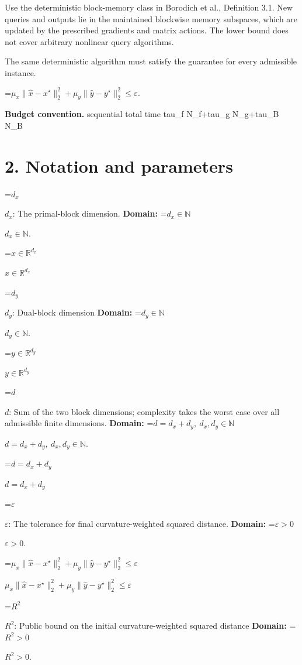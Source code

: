 \documentclass[10pt,a4paper]{article}
\newcommand{\AtlasMath}[1]{\par\begingroup\centering\setbox0=\hbox{$\displaystyle #1$}\ifdim\wd0>1.4\linewidth\typeout{ATLAS WIDE FORMULA: \the\wd0}\fi\ifdim\wd0>\linewidth\resizebox{\linewidth}{!}{\box0}\else\box0\fi\par\endgroup}
\newcommand{\AtlasInlineMath}[1]{\begingroup\setbox0=\hbox{$#1$}\ifdim\wd0>.4\linewidth\endgroup\AtlasMath{#1}\else\endgroup$#1$\fi}
\begin{document}
Use the deterministic block-memory class in Borodich et al., Definition 3.1. New queries and outputs lie in the maintained blockwise memory subspaces, which are updated by the prescribed gradients and matrix actions. The lower bound does not cover arbitrary nonlinear query algorithms.



The same deterministic algorithm must satisfy the guarantee for every admissible instance.




\AtlasMath{\mu_x\|\widehat{x}-x^\star\|_2^2+\mu_y\|\widehat{y}-y^\star\|_2^2\le\varepsilon.}




\textbf{Budget convention.} sequential total time tau\_f N\_f+tau\_g N\_g+tau\_B N\_B



\section{2. Notation and parameters}


\AtlasInlineMath{d_x}: The primal-block dimension. \textbf{Domain:} \AtlasInlineMath{d_x\in\mathbb N}.



\AtlasInlineMath{x\in\mathbb R^{d_x}}



\AtlasInlineMath{d_y}: Dual-block dimension \textbf{Domain:} \AtlasInlineMath{d_y\in\mathbb N}.



\AtlasInlineMath{y\in\mathbb R^{d_y}}



\AtlasInlineMath{d}: Sum of the two block dimensions; complexity takes the worst case over all admissible finite dimensions. \textbf{Domain:} \AtlasInlineMath{d=d_x+d_y,\ d_x,d_y\in\mathbb N}.



\AtlasInlineMath{d=d_x+d_y}



\AtlasInlineMath{\varepsilon}: The tolerance for final curvature-weighted squared distance. \textbf{Domain:} \AtlasInlineMath{\varepsilon>0}.



\AtlasInlineMath{\mu_x\|\widehat x-x^\star\|_2^2+\mu_y\|\widehat y-y^\star\|_2^2\le\varepsilon}



\AtlasInlineMath{R^2}: Public bound on the initial curvature-weighted squared distance \textbf{Domain:} \AtlasInlineMath{R^2>0}.
\end{document}
